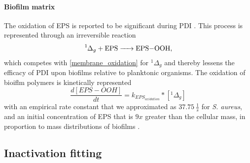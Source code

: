 \paragraph{Biofilm matrix} 
The oxidation of EPS is reported to be significant during PDI \cite{Beirao2014PhotodynamicPorphyrin}. This process is represented through an irreversible reaction
\begin{equation} \label{EPS_oxidation}
    \ce{^1\Delta_g + EPS -> EPS-OOH},
\end{equation}
which competes with \cref{membrane_oxidation} for $^1\Delta_g$ and thereby lessens the efficacy of PDI upon biofilms relative to planktonic organisms. The oxidation of bioiflm polymers is kinetically represented  
\begin{equation} \label{EPS_oxidation_kinetics}
    \frac{d[EPS-OOH]}{dt} = k_{EPS_{oxidation}}*[^1\Delta_g]
\end{equation}
with an empirical rate constant that we approximated as $37.75~\frac{1}{s}$ for \textit{S. aureus}, and an initial concentration of EPS that is $9x$ greater than the cellular mass, in proportion to mass distributions of biofilms \cite{Flemming2010TheMatrix}.

\subsection{Inactivation fitting}


